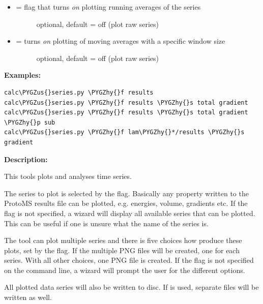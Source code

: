 \documentclass[letterpaper,10pt,english]{sphinxmanual}
\def\PYGZus{\char`\_}
\def\PYGZhy{\char`\-}
\begin{document}
\begin{itemize}
\begin{description}
\end{description}

\item {} \begin{description}
\item[{ = flag that turns \emph{on} plotting running averages of the series}] \leavevmode
optional, default = off (plot raw series)

\end{description}

\item {} \begin{description}
\item[{ = turns \emph{on} plotting of moving averages with a specific window size}] \leavevmode
optional, default = off (plot raw series)

\end{description}

\end{itemize}

\textbf{Examples:}

\begin{Verbatim}[commandchars=\\\{\}]
calc\PYGZus{}series.py \PYGZhy{}f results
calc\PYGZus{}series.py \PYGZhy{}f results \PYGZhy{}s total gradient
calc\PYGZus{}series.py \PYGZhy{}f results \PYGZhy{}s total gradient \PYGZhy{}p sub
calc\PYGZus{}series.py \PYGZhy{}f lam\PYGZhy{}*/results \PYGZhy{}s gradient
\end{Verbatim}

\textbf{Description:}

This tools plots and analyses time series.

The series to plot is selected by the  flag. Basically any property written to the ProtoMS results file can be plotted, e.g. energies, volume, gradients etc. If the  flag is not specified, a wizard will display all available series that can be plotted. This can be useful if one is unsure what the name of the series is.

The tool can plot multiple series and there is five choices how produce these plots, set by the  flag. If the  multiple PNG files will be created, one for each series. With all other choices, one PNG file is created. If the  flag is not specified on the command line, a wizard will prompt the user for the different options.

All plotted data series will also be written to disc. If  is used, separate files will be written as well.
\end{document}

